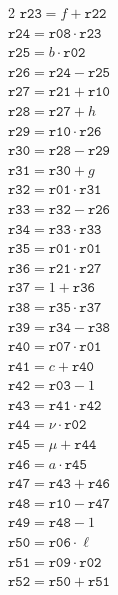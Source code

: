 \documentclass[10pt]{article}
\begin{document}
\begin{multicols}{2}
\(\mathtt{r23} = f + \mathtt{r22}\)\\
\(\mathtt{r24} = \mathtt{r08} \cdot \mathtt{r23}\)\\
\(\mathtt{r25} = b \cdot \mathtt{r02}\)\\
\(\mathtt{r26} = \mathtt{r24} - \mathtt{r25}\)\\
\(\mathtt{r27} = \mathtt{r21} + \mathtt{r10}\)\\
\(\mathtt{r28} = \mathtt{r27} + h\)\\
\(\mathtt{r29} = \mathtt{r10} \cdot \mathtt{r26}\)\\
\(\mathtt{r30} = \mathtt{r28} - \mathtt{r29}\)\\
\(\mathtt{r31} = \mathtt{r30} + g\)\\
\(\mathtt{r32} = \mathtt{r01} \cdot \mathtt{r31}\)\\
\(\mathtt{r33} = \mathtt{r32} - \mathtt{r26}\)\\
\(\mathtt{r34} = \mathtt{r33} \cdot \mathtt{r33}\)\\
\(\mathtt{r35} = \mathtt{r01} \cdot \mathtt{r01}\)\\
\(\mathtt{r36} = \mathtt{r21} \cdot \mathtt{r27}\)\\
\(\mathtt{r37} = 1 + \mathtt{r36}\)\\
\(\mathtt{r38} = \mathtt{r35} \cdot \mathtt{r37}\)\\
\(\mathtt{r39} = \mathtt{r34} - \mathtt{r38}\)\\
\(\mathtt{r40} = \mathtt{r07} \cdot \mathtt{r01}\)\\
\(\mathtt{r41} = c + \mathtt{r40}\)\\
\(\mathtt{r42} = \mathtt{r03} - 1\)\\
\(\mathtt{r43} = \mathtt{r41} \cdot \mathtt{r42}\)\\
\(\mathtt{r44} = \nu \cdot \mathtt{r02}\)\\
\(\mathtt{r45} = \mu + \mathtt{r44}\)\\
\(\mathtt{r46} = a \cdot \mathtt{r45}\)\\
\columnbreak
\(\mathtt{r47} = \mathtt{r43} + \mathtt{r46}\)\\
\(\mathtt{r48} = \mathtt{r10} - \mathtt{r47}\)\\
\(\mathtt{r49} = \mathtt{r48} - 1\)\\
\(\mathtt{r50} = \mathtt{r06} \cdot \ell\)\\
\(\mathtt{r51} = \mathtt{r09} \cdot \mathtt{r02}\)\\
\(\mathtt{r52} = \mathtt{r50} + \mathtt{r51}\)\\

\end{multicols}
\end{document}
